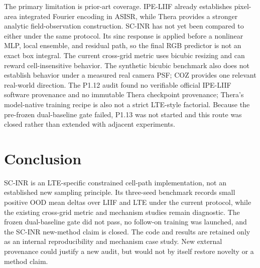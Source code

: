 \documentclass[10pt]{article}
\begin{document}
The primary limitation is prior-art coverage. IPE-LIIF already establishes
pixel-area integrated Fourier encoding in ASISR, while Thera provides a stronger
analytic field-observation construction. SC-INR has not yet been compared to
either under the same protocol. Its sinc response is applied before a nonlinear
MLP, local ensemble, and residual path, so the final RGB predictor is not an
exact box integral. The current cross-grid metric uses bicubic resizing and can
reward cell-insensitive behavior. The synthetic bicubic benchmark also does not
establish behavior under a measured real camera PSF; COZ provides one relevant
real-world direction. The P1.12 audit found no verifiable official IPE-LIIF
software provenance and no immutable Thera checkpoint provenance; Thera's
model-native training recipe is also not a strict LTE-style factorial. Because
the pre-frozen dual-baseline gate failed, P1.13 was not started and this route
was closed rather than extended with adjacent experiments.

\section{Conclusion}

SC-INR is an LTE-specific constrained cell-path implementation, not an
established new sampling principle. Its three-seed benchmark records small
positive OOD mean deltas over LIIF and LTE under the current protocol, while the
existing cross-grid metric and mechanism studies remain diagnostic. The frozen
dual-baseline gate did not pass, no follow-on training was launched, and the
SC-INR new-method claim is closed. The code and results are retained only as an
internal reproducibility and mechanism case study. New external provenance
could justify a new audit, but would not by itself restore novelty or a method
claim.

\small


\end{document}
